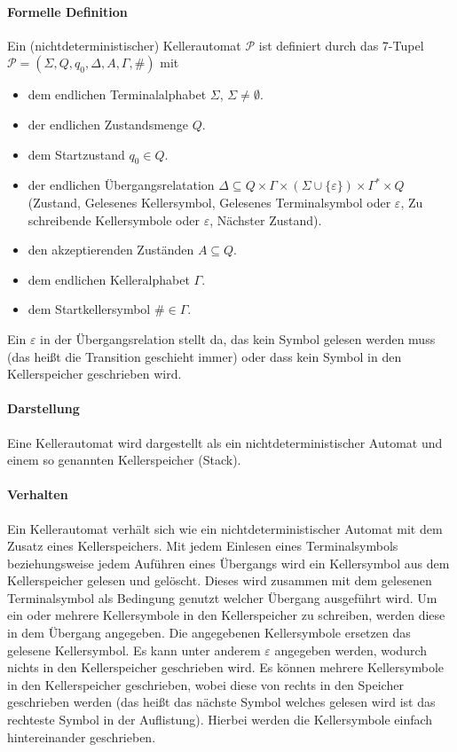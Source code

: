 \documentclass[a4paper, 11pt, accentcolor = tud3b]{tudreport}
\begin{document}
            \paragraph{Formelle Definition}
                Ein (nichtdeterministischer) Kellerautomat $ \mathcal{P} $ ist definiert durch das 7-Tupel $ \mathcal{P} = (\Sigma, Q, q _ 0, \Delta, A, \Gamma, \#) $ mit
                \begin{itemize}
                    \item dem endlichen Terminalalphabet $ \Sigma $, $ \Sigma \neq \emptyset $.
                    \item der endlichen Zustandsmenge $ Q $.
                    \item dem Startzustand $ q _ 0 \in Q $.
                    \item der endlichen Übergangsrelatation $ \Delta \subseteq Q \times \Gamma \times (\Sigma \cup \{ \varepsilon \}) \times \Gamma ^ * \times Q $ (Zustand, Gelesenes Kellersymbol, Gelesenes Terminalsymbol oder $ \varepsilon $, Zu schreibende Kellersymbole oder $ \varepsilon $, Nächster Zustand).
                    \item den akzeptierenden Zuständen $ A \subseteq Q $.
                    \item dem endlichen Kelleralphabet $ \Gamma $.
                    \item dem Startkellersymbol $ \# \in \Gamma $.
                \end{itemize}
                Ein $ \varepsilon $ in der Übergangsrelation stellt da, das kein Symbol gelesen werden muss (das heißt die Transition geschieht immer) oder dass kein Symbol in den Kellerspeicher geschrieben wird.

            \paragraph{Darstellung}
                Eine Kellerautomat wird dargestellt als ein nichtdeterministischer Automat und einem so genannten Kellerspeicher (Stack).

            \paragraph{Verhalten}
                Ein Kellerautomat verhält sich wie ein nichtdeterministischer Automat mit dem Zusatz eines Kellerspeichers. Mit jedem Einlesen eines Terminalsymbols beziehungsweise jedem Auführen eines Übergangs wird ein Kellersymbol aus dem Kellerspeicher gelesen und gelöscht. Dieses wird zusammen mit dem gelesenen Terminalsymbol als Bedingung genutzt welcher Übergang ausgeführt wird. Um ein oder mehrere Kellersymbole in den Kellerspeicher zu schreiben, werden diese in dem Übergang angegeben. Die angegebenen Kellersymbole ersetzen das gelesene Kellersymbol. Es kann unter anderem $ \varepsilon $ angegeben werden, wodurch nichts in den Kellerspeicher geschrieben wird. Es können mehrere Kellersymbole in den Kellerspeicher geschrieben, wobei diese von rechts in den Speicher geschrieben werden (das heißt das nächste Symbol welches gelesen wird ist das rechteste Symbol in der Auflistung). Hierbei werden die Kellersymbole einfach hintereinander geschrieben.
\end{document}
